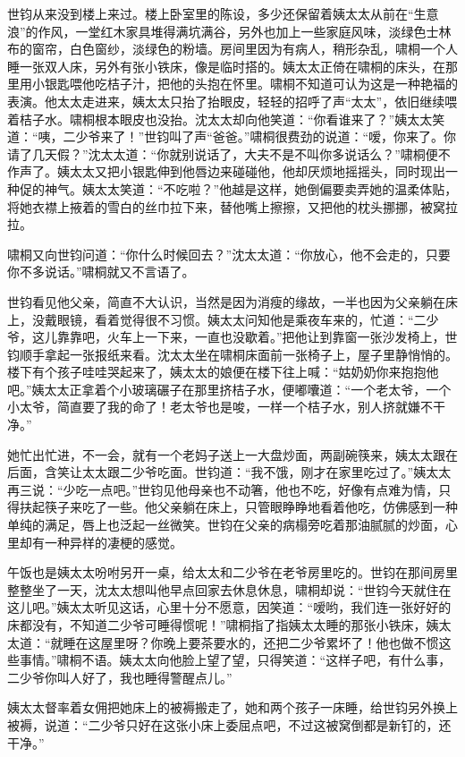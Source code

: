 \par 世钧从来没到楼上来过。楼上卧室里的陈设，多少还保留着姨太太从前在“生意浪”的作风，一堂红木家具堆得满坑满谷，另外也加上一些家庭风味，淡绿色士林布的窗帘，白色窗纱，淡绿色的粉墙。房间里因为有病人，稍形杂乱，啸桐一个人睡一张双人床，另外有张小铁床，像是临时搭的。姨太太正倚在啸桐的床头，在那里用小银匙喂他吃桔子汁，把他的头抱在怀里。啸桐不知道可认为这是一种艳福的表演。他太太走进来，姨太太只抬了抬眼皮，轻轻的招呼了声“太太”，依旧继续喂着桔子水。啸桐根本眼皮也没抬。沈太太却向他笑道：“你看谁来了？”姨太太笑道：“咦，二少爷来了！”世钧叫了声“爸爸。”啸桐很费劲的说道：“嗳，你来了。你请了几天假？”沈太太道：“你就别说话了，大夫不是不叫你多说话么？”啸桐便不作声了。姨太太又把小银匙伸到他唇边来碰碰他，他却厌烦地摇摇头，同时现出一种促的神气。姨太太笑道：“不吃啦？”他越是这样，她倒偏要卖弄她的温柔体贴，将她衣襟上掖着的雪白的丝巾拉下来，替他嘴上擦擦，又把他的枕头挪挪，被窝拉拉。
\par 啸桐又向世钧问道：“你什么时候回去？”沈太太道：“你放心，他不会走的，只要你不多说话。”啸桐就又不言语了。
\par 世钧看见他父亲，简直不大认识，当然是因为消瘦的缘故，一半也因为父亲躺在床上，没戴眼镜，看着觉得很不习惯。姨太太问知他是乘夜车来的，忙道：“二少爷，这儿靠靠吧，火车上一下来，一直也没歇着。”把他让到靠窗一张沙发椅上，世钧顺手拿起一张报纸来看。沈太太坐在啸桐床面前一张椅子上，屋子里静悄悄的。楼下有个孩子哇哇哭起来了，姨太太的娘便在楼下往上喊：“姑奶奶你来抱抱他吧。”姨太太正拿着个小玻璃碾子在那里挤桔子水，便嘟囔道：“一个老太爷，一个小太爷，简直要了我的命了！老太爷也是唆，一样一个桔子水，别人挤就嫌不干净。”
\par 她忙出忙进，不一会，就有一个老妈子送上一大盘炒面，两副碗筷来，姨太太跟在后面，含笑让太太跟二少爷吃面。世钧道：“我不饿，刚才在家里吃过了。”姨太太再三说：“少吃一点吧。”世钧见他母亲也不动箸，他也不吃，好像有点难为情，只得扶起筷子来吃了一些。他父亲躺在床上，只管眼睁睁地看着他吃，仿佛感到一种单纯的满足，唇上也泛起一丝微笑。世钧在父亲的病榻旁吃着那油腻腻的炒面，心里却有一种异样的凄梗的感觉。
\par 午饭也是姨太太吩咐另开一桌，给太太和二少爷在老爷房里吃的。世钧在那间房里整整坐了一天，沈太太想叫他早点回家去休息休息，啸桐却说：“世钧今天就住在这儿吧。”姨太太听见这话，心里十分不愿意，因笑道：“嗳哟，我们连一张好好的床都没有，不知道二少爷可睡得惯呢！”啸桐指了指姨太太睡的那张小铁床，姨太太道：“就睡在这屋里呀？你晚上要茶要水的，还把二少爷累坏了！他也做不惯这些事情。”啸桐不语。姨太太向他脸上望了望，只得笑道：“这样子吧，有什么事，二少爷你叫人好了，我也睡得警醒点儿。”
\par 姨太太督率着女佣把她床上的被褥搬走了，她和两个孩子一床睡，给世钧另外换上被褥，说道：“二少爷只好在这张小床上委屈点吧，不过这被窝倒都是新钉的，还干净。”
